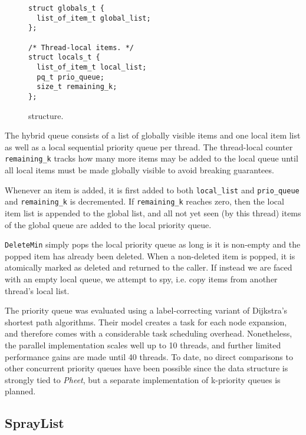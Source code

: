 \documentclass[a4paper,10pt]{article}
\begin{document}
\begin{figure}[h]
\begin{lstlisting}
struct globals_t {
  list_of_item_t global_list;
};

/* Thread-local items. */
struct locals_t {
  list_of_item_t local_list;
  pq_t prio_queue;
  size_t remaining_k;
};
\end{lstlisting}
\caption{\citeauthor{wimmer2013data} structure.}
\label{fig:wimmerq}
\end{figure}

The hybrid queue consists of a list of globally visible items and one local item list as well as a local
sequential priority queue per thread. The thread-local counter \lstinline|remaining_k| tracks how many more
items may be added to the local queue until all local items must be made globally visible to avoid
breaking guarantees.

Whenever an item is added, it is first added to both \lstinline|local_list| and \lstinline|prio_queue|
and \lstinline|remaining_k| is decremented. If \lstinline|remaining_k| reaches zero, then the local
item list is appended to the global list, and all not yet seen (by this thread) items of the global
queue are added to the local priority queue.

\lstinline|DeleteMin| simply pops the local priority queue as long is it is non-empty and the popped
item has already been deleted. When a non-deleted item is popped, it is atomically marked as deleted
and returned to the caller. If instead we are faced with an empty local queue, we attempt to spy,
i.e. copy items from another thread's local list.


The \citeauthor{wimmer2013data} priority queue was evaluated using a label-correcting variant
of Dijkstra's shortest path algorithms. Their model creates a task for each node
expansion, and therefore comes with a considerable task scheduling overhead. Nonetheless,
the parallel implementation scales well up to 10 threads, and further limited performance
gains are made until 40 threads. To date, no direct comparisons to other concurrent
priority queues have been possible since the data structure is strongly tied to \emph{Pheet},
but a separate implementation of k-priority queues is planned.

\subsection{SprayList} \label{sec:spraylist}
\end{document}
